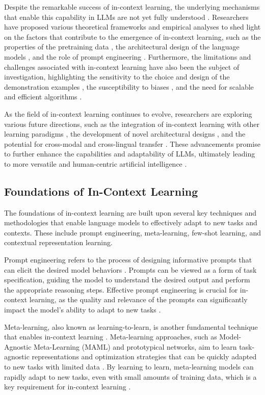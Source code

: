\documentclass[11pt]{article}
\begin{document}
Despite the remarkable success of in-context learning, the underlying mechanisms that enable this capability in LLMs are not yet fully understood \cite{ref6}. Researchers have proposed various theoretical frameworks and empirical analyses to shed light on the factors that contribute to the emergence of in-context learning, such as the properties of the pretraining data \cite{ref5}, the architectural design of the language models \cite{ref13}, and the role of prompt engineering \cite{ref14}. Furthermore, the limitations and challenges associated with in-context learning have also been the subject of investigation, highlighting the sensitivity to the choice and design of the demonstration examples \cite{ref15}, the susceptibility to biases \cite{ref16}, and the need for scalable and efficient algorithms \cite{ref17,ref18}.

As the field of in-context learning continues to evolve, researchers are exploring various future directions, such as the integration of in-context learning with other learning paradigms \cite{ref2,ref19}, the development of novel architectural designs \cite{ref13}, and the potential for cross-modal and cross-lingual transfer \cite{ref11,ref20}. These advancements promise to further enhance the capabilities and adaptability of LLMs, ultimately leading to more versatile and human-centric artificial intelligence \cite{ref21}.

\subsection{Foundations of In-Context Learning}

The foundations of in-context learning are built upon several key techniques and methodologies that enable language models to effectively adapt to new tasks and contexts. These include prompt engineering, meta-learning, few-shot learning, and contextual representation learning.

Prompt engineering refers to the process of designing informative prompts that can elicit the desired model behaviors \cite{ref22,ref23}. Prompts can be viewed as a form of task specification, guiding the model to understand the desired output and perform the appropriate reasoning steps. Effective prompt engineering is crucial for in-context learning, as the quality and relevance of the prompts can significantly impact the model's ability to adapt to new tasks \cite{ref24}.

Meta-learning, also known as learning-to-learn, is another fundamental technique that enables in-context learning \cite{ref25}. Meta-learning approaches, such as Model-Agnostic Meta-Learning (MAML) and prototypical networks, aim to learn task-agnostic representations and optimization strategies that can be quickly adapted to new tasks with limited data \cite{ref26,ref27}. By learning to learn, meta-learning models can rapidly adapt to new tasks, even with small amounts of training data, which is a key requirement for in-context learning \cite{ref28}.
\end{document}

